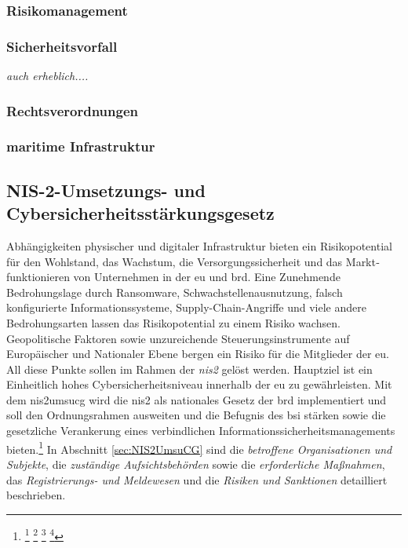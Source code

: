 \documentclass[11pt,a4paper,hidelinks]{article}   %
\begin{document}
            \subsubsection{Risikomanagement}

            \subsubsection{Sicherheitsvorfall}
            \emph{auch erheblich....}

            \subsubsection{Rechtsverordnungen}

            \subsubsection{maritime Infrastruktur }

            \subsection{NIS-2-Umsetzungs- und Cybersicherheitsstärkungsgesetz}\label{subsec:NIS2UmsuCG}
            Abhängigkeiten physischer und digitaler Infrastruktur bieten ein Risikopotential für den Wohlstand, das Wachstum, die Versorgungssicherheit und das Markt­funktionieren von Unternehmen in der \gls{eu} und \gls{brd}. Eine Zunehmende Bedrohungslage durch Ransomware, Schwachstellen­ausnutzung, falsch konfigurierte Informationssysteme, Supply-Chain-Angriffe und viele andere Bedrohungsarten lassen das Risikopotential zu einem Risiko wachsen. Geopolitische Faktoren sowie unzureichende Steuerungs­instrumente auf Europäischer und Nationaler Ebene bergen ein Risiko für die Mitglieder der \gls{eu}. All diese Punkte sollen im Rahmen der \emph{\gls{nis2}} gelöst werden. Hauptziel ist ein Einheitlich hohes Cyber­sicherheits­niveau innerhalb der \gls{eu} zu gewährleisten. Mit dem \gls{nis2umsucg} wird die \gls{nis2} als nationales Gesetz der \gls{brd} implementiert und soll den Ordnungs­rahmen ausweiten und die Befugnis des \gls{bsi} stärken sowie die gesetzliche Verankerung eines verbindlichen Informations­sicherheits­managements bieten.\footnote{
                \footcite[Vgl. S 1 - 2][]{NIS2UmsuCG}
                \footcite[Vgl. Absatz 1, 3, 5][]{EU2022-2555}
                \footcite[Vgl. S. 14 - 15][]{bsi-lage-itsicherheit-2023}
                \footcite[S. 9, 12 - 13 \& 37][postnote]{enisa-thread-landscape}
            } In Abschnitt \ref{sec:NIS2UmsuCG} sind die \emph{betroffene Organisationen und Subjekte}, die \emph{zuständige Aufsichtsbehörden} sowie die \emph{erforderliche Maßnahmen}, das \emph{Registrierungs- und Meldewesen} und die \emph{Risiken und Sanktionen} detailliert beschrieben.
\end{document}
